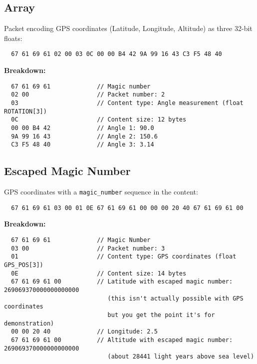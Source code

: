 \documentclass[a4paper]{article}
\begin{document}
\subsection{Array}
\newpage
Packet encoding GPS coordinates (Latitude, Longitude, Altitude) as three 32-bit floats:
\begin{verbatim}
  67 61 69 61 02 00 03 0C 00 00 B4 42 9A 99 16 43 C3 F5 48 40
\end{verbatim}
\textbf{Breakdown:}
\begin{verbatim}
  67 61 69 61             // Magic number
  02 00                   // Packet number: 2
  03                      // Content type: Angle measurement (float ROTATION[3])
  0C                      // Content size: 12 bytes
  00 00 B4 42             // Angle 1: 90.0
  9A 99 16 43             // Angle 2: 150.6
  C3 F5 48 40             // Angle 3: 3.14
\end{verbatim}

\subsection{Escaped Magic Number}
GPS coordinates with a \texttt{magic\_number} sequence in the content:
\begin{verbatim}
  67 61 69 61 03 00 01 0E 67 61 69 61 00 00 00 20 40 67 61 69 61 00
\end{verbatim}
\textbf{Breakdown:}
\begin{verbatim}
  67 61 69 61             // Magic Number
  03 00                   // Packet number: 3
  01                      // Content type: GPS coordinates (float GPS_POS[3])
  0E                      // Content size: 14 bytes
  67 61 69 61 00          // Latitude with escaped magic number: 269069370000000000000 
                             (this isn't actually possible with GPS coordinates
                             but you get the point it's for demonstration)
  00 00 20 40             // Longitude: 2.5
  67 61 69 61 00          // Altitude with escaped magic number: 269069370000000000000
                             (about 28441 light years above sea level)
\end{verbatim}
\end{document}
